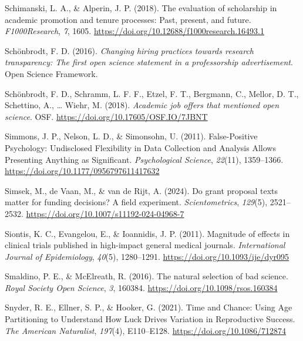 \documentclass[
  ,man,mask,floatsintext]{apa6}
\newlength{\cslhangindent}
\newlength{\cslentryspacingunit} %
\newenvironment{CSLReferences}[2] %
 {%
  \setlength{\parindent}{0pt}
  \ifodd #1
  \let\oldpar\par
  \def\par{\hangindent=\cslhangindent\oldpar}
  \fi
  \setlength{\parskip}{#2\cslentryspacingunit}
 }%
 {}
\begin{document}
\begin{CSLReferences}{1}{0}
\leavevmode{}%
Schimanski, L. A., \& Alperin, J. P. (2018). The evaluation of scholarship in academic promotion and tenure processes: {Past}, present, and future. \emph{F1000Research}, \emph{7}, 1605. \url{https://doi.org/10.12688/f1000research.16493.1}

\leavevmode{}%
Schönbrodt, F. D. (2016). \emph{Changing hiring practices towards research transparency: {The} first open science statement in a professorship advertisement}. Open Science Framework.

\leavevmode{}%
Schönbrodt, F. D., Schramm, L. F. F., Etzel, F. T., Bergmann, C., Mellor, D. T., Schettino, A., \ldots{} Wiehr, M. (2018). \emph{Academic job offers that mentioned open science}. OSF. \url{https://doi.org/10.17605/OSF.IO/7JBNT}

\leavevmode{}%
Simmons, J. P., Nelson, L. D., \& Simonsohn, U. (2011). False-{Positive Psychology}: {Undisclosed Flexibility} in {Data Collection} and {Analysis Allows Presenting Anything} as {Significant}. \emph{Psychological Science}, \emph{22}(11), 1359--1366. \url{https://doi.org/10.1177/0956797611417632}

\leavevmode{}%
Simsek, M., de Vaan, M., \& van de Rijt, A. (2024). Do grant proposal texts matter for funding decisions? {A} field experiment. \emph{Scientometrics}, \emph{129}(5), 2521--2532. \url{https://doi.org/10.1007/s11192-024-04968-7}

\leavevmode{}%
Siontis, K. C., Evangelou, E., \& Ioannidis, J. P. (2011). Magnitude of effects in clinical trials published in high-impact general medical journals. \emph{International Journal of Epidemiology}, \emph{40}(5), 1280--1291. \url{https://doi.org/10.1093/ije/dyr095}

\leavevmode{}%
Smaldino, P. E., \& McElreath, R. (2016). The natural selection of bad science. \emph{Royal Society Open Science}, \emph{3}, 160384. \url{https://doi.org/10.1098/rsos.160384}

\leavevmode{}%
Snyder, R. E., Ellner, S. P., \& Hooker, G. (2021). Time and {Chance}: {Using Age Partitioning} to {Understand How Luck Drives Variation} in {Reproductive Success}. \emph{The American Naturalist}, \emph{197}(4), E110--E128. \url{https://doi.org/10.1086/712874}


\end{CSLReferences}
\end{document}
